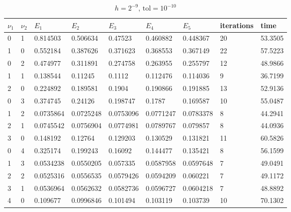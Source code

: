 \documentclass{article} %
\theoremstyle{plain}
\numberwithin{equation}{section} %
\numberwithin{figure}{section} %
\numberwithin{table}{section} %
\begin{document}
\begin{table}[ht!]
\centering
\vspace{-5cm}
\begin{tabular}{||l|l|||l|l|l|l|l||l||l||}
\hline\hline
   $\nu_1$ &   $\nu_2$ &       $E_1$ &       $E_2$ &       $E_3$ &       $E_4$ &      $E_5$ &   iterations &     time \\
\hline\hline
      0 &      1 & 0.814503  & 0.506634  & 0.47523   & 0.460882  & 0.448367  &    {\color{red}20} & {\color{red}53.3505} \\\hline
      1 &      0 & {\color{red}0.552184}  & {\color{red}0.387626}  & {\color{red}0.371623}  & {\color{red}0.368553}  & {\color{red}0.367149}  &    22 & 57.5223 \\\hline\hline\hline

      0 &      2 & 0.474977  & 0.311891  & 0.274758  & 0.263955  & 0.255797  &    12 & 48.9866 \\\hline
      1 &      1 & {\color{red}0.138544}  & {\color{red}0.11245}   & {\color{red}0.1112}    & {\color{red}0.112476}  & {\color{red}0.114036}  &     {\color{red}9} & {\color{red}36.7199} \\\hline
      2 &      0 & 0.224892  & 0.189581  & 0.1904    & 0.190866  & 0.191885  &    13 & 52.9136 \\\hline\hline\hline

      0 &      3 & 0.374745  & 0.24126   & 0.198747  & 0.1787    & 0.169587  &    10 & 55.0487 \\\hline
      1 &      2 & {\color{red}0.0735864} & {\color{red}0.0725248} & {\color{red}0.0753096} & {\color{red}0.0771247} & {\color{red}0.0783378} &     {\color{red}8} & 44.2941 \\\hline
      2 &      1 & 0.0745542 & 0.0756904 & 0.0774981 & 0.0789767 & 0.079857  &     {\color{red}8} & {\color{red}44.0936} \\\hline
      3 &      0 & 0.148192  & 0.12764   & 0.129203  & 0.130529  & 0.131821  &    11 & 60.5826 \\\hline\hline\hline

      0 &      4 & 0.325174  & 0.199243  & 0.16092   & 0.144477  & 0.135421  &     8 & 56.1599 \\\hline
      1 &      3 & 0.0534238 & {\color{red}0.0550205} & {\color{red}0.057335}  & {\color{red}0.0587958} & {\color{red}0.0597648} &     {\color{red}7} & {\color{red}49.0491} \\\hline
      2 &      2 & {\color{red}0.0525316} & 0.0556535 & 0.0579426 & 0.0594209 & 0.060221  &     {\color{red}7} & 49.1172 \\\hline
      3 &      1 & 0.0536964 & 0.0562632 & 0.0582736 & 0.0596727 & 0.0604218 &     {\color{red}7} & 48.8892 \\\hline
      4 &      0 & 0.109677  & 0.0996846 & 0.101494  & 0.103119  & 0.103739  &    10 & 70.1302 \\\hline\hline\hline
\end{tabular}
\caption*{$h=2^{-9}$, $\text{tol}=10^{-10}$}
\end{table}
\end{document}
